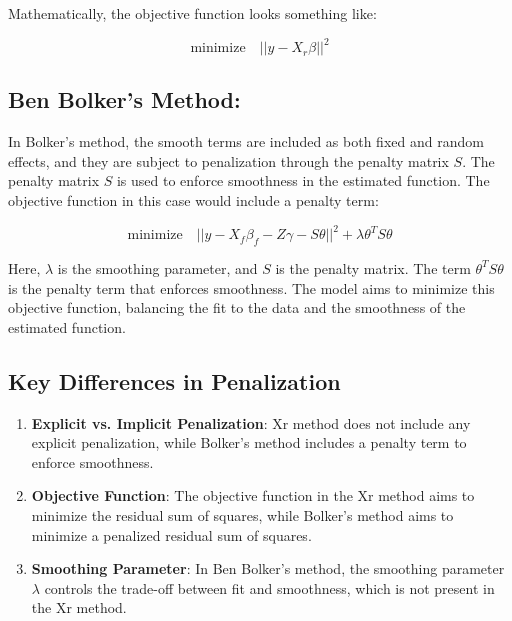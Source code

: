\documentclass{article}
\begin{document}
Mathematically, the objective function looks something like:

\begin{equation}
\text{minimize} \quad ||y - X_r \beta||^2
\end{equation}

\subsection{Ben Bolker's Method:}

In Bolker's method, the smooth terms are included as both fixed and random effects, and they are subject to penalization through the penalty matrix \(S\). The penalty matrix \(S\) is used to enforce smoothness in the estimated function. The objective function in this case would include a penalty term:

\begin{equation}
\text{minimize} \quad ||y - X_f \beta_f - Z \gamma - S \theta||^2 + \lambda \theta^T S \theta
\end{equation}

Here, \(\lambda\) is the smoothing parameter, and \(S\) is the penalty matrix. The term \(\theta^T S \theta\) is the penalty term that enforces smoothness. The model aims to minimize this objective function, balancing the fit to the data and the smoothness of the estimated function.

\subsection{Key Differences in Penalization}

\begin{enumerate}
    \item \textbf{Explicit vs. Implicit Penalization}: Xr method does not include any explicit penalization, while Bolker's method includes a penalty term to enforce smoothness.
    
    \item \textbf{Objective Function}: The objective function in the Xr method aims to minimize the residual sum of squares, while Bolker's method aims to minimize a penalized residual sum of squares.
    
    \item \textbf{Smoothing Parameter}: In Ben Bolker's method, the smoothing parameter \(\lambda\) controls the trade-off between fit and smoothness, which is not present in the Xr method.
\end{enumerate}
\end{document}
